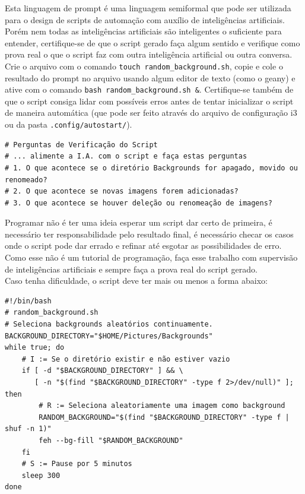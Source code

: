 \documentclass[12pt,a4paper]{article}
\begin{document}
Esta linguagem de prompt é uma linguagem semiformal que pode ser utilizada para o design de scripts de automação com auxílio de inteligências artificiais. Porém nem todas as inteligências artificiais são inteligentes o suficiente para entender, certifique-se de que o script gerado faça algum sentido e verifique como prova real o que o script faz com outra inteligência artificial ou outra conversa.\\

Crie o arquivo com o comando \texttt{touch random\_background.sh}, copie e cole o resultado do prompt no arquivo usando algum editor de texto (como o geany) e ative com o comando \texttt{bash random\_background.sh \&}. Certifique-se também de que o script consiga lidar com possíveis erros antes de tentar inicializar o script de maneira automática (que pode ser feito através do arquivo de configuração i3 ou da pasta \texttt{.config/autostart/}). \\

\begin{lstlisting}
# Perguntas de Verificação do Script
# ... alimente a I.A. com o script e faça estas perguntas 
# 1. O que acontece se o diretório Backgrounds for apagado, movido ou renomeado?
# 2. O que acontece se novas imagens forem adicionadas?
# 3. O que acontece se houver deleção ou renomeação de imagens?
\end{lstlisting}

\vspace{\baselineskip}

Programar não é ter uma ideia esperar um script dar certo de primeira, é necessário ter responsabilidade pelo resultado final, é necessário checar os casos onde o script pode dar errado e refinar até esgotar as possibilidades de erro. Como esse não é um tutorial de programação, faça esse trabalho com supervisão de inteligências artificiais e sempre faça a prova real do script gerado. \\

Caso tenha dificuldade, o script deve ter mais ou menos a forma abaixo:\\

\begin{lstlisting}
#!/bin/bash
# random_background.sh
# Seleciona backgrounds aleatórios continuamente.
BACKGROUND_DIRECTORY="$HOME/Pictures/Backgrounds"
while true; do
    # I := Se o diretório existir e não estiver vazio
    if [ -d "$BACKGROUND_DIRECTORY" ] && \
       [ -n "$(find "$BACKGROUND_DIRECTORY" -type f 2>/dev/null)" ]; then
        # R := Seleciona aleatoriamente uma imagem como background
        RANDOM_BACKGROUND="$(find "$BACKGROUND_DIRECTORY" -type f | shuf -n 1)"
        feh --bg-fill "$RANDOM_BACKGROUND"
    fi
    # S := Pause por 5 minutos
    sleep 300
done
\end{lstlisting}


\end{document}
